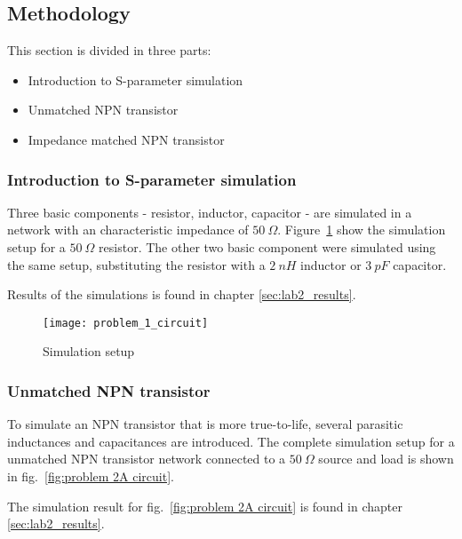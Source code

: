 \documentclass[report.tex]{subfiles}
\begin{document}
\subsection{Methodology}
\label{sec:lab2 methodology}
This section is divided in three parts:
\begin{itemize}
    \item Introduction to S-parameter simulation
    \item Unmatched NPN transistor
    \item Impedance matched NPN transistor
\end{itemize}
%
%

\subsubsection{Introduction to S-parameter simulation}
Three basic components - resistor, inductor, capacitor - are simulated in a network with an characteristic impedance of $50~\Omega$. Figure~\ref{fig:problem 1 circuit} show the simulation setup for a $50~\Omega$ resistor. The other two basic component were simulated using the same setup, substituting the resistor with a $2~nH$ inductor or $3~pF$ capacitor.

Results of the simulations is found in chapter \ref{sec:lab2_results}.

\begin{figure}[h]
    \centering
    \texttt{[image: problem\_1\_circuit]}
    \caption{Simulation setup}
    \label{fig:problem 1 circuit}
\end{figure}

\subsubsection{Unmatched NPN transistor}
To simulate an NPN transistor that is more true-to-life, several parasitic inductances and capacitances are introduced. The complete simulation setup for a unmatched NPN transistor network connected to a $50~\Omega$ source and load is shown in fig.~\ref{fig:problem 2A circuit}.

The simulation result for fig.~\ref{fig:problem 2A circuit} is found in chapter \ref{sec:lab2_results}.
\end{document}
